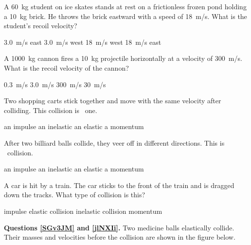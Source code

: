 \documentclass[]{exam}
\begin{document}
\begin{questions}
\question
A \SI{60}{kg} student on ice skates stands at rest on a frictionless frozen pond holding a \SI{10}{kg} brick. He throws the brick eastward with a speed of \SI{18}{m/s}. What is the student's recoil velocity?

\begin{randomizechoices}
\choice \SI{3.0}{m/s} east
\correctchoice \SI{3.0}{m/s} west
\choice \SI{18}{m/s} west
\choice \SI{18}{m/s} east
\end{randomizechoices}

\question
A \SI{1000}{kg} cannon fires a \SI{10}{kg} projectile horizontally at a velocity of \SI{300}{m/s}. What is the recoil velocity of the cannon?

\begin{randomizechoices}
\choice \SI{0.3}{m/s}
\correctchoice \SI{3.0}{m/s}
\choice \SI{300}{m/s}
\choice \SI{30}{m/s}
\end{randomizechoices}

\question
Two shopping carts stick together and move with the same velocity after colliding. This collision is \fillin\ one.

\begin{randomizechoices}
\choice an impulse
\correctchoice an inelastic
\choice an elastic
\choice a momentum
\end{randomizechoices}

\question
After two billiard balls collide, they veer off in different directions. This is \fillin\ collision.

\begin{randomizechoices}
\choice an impulse
\choice an inelastic
\correctchoice an elastic
\choice a momentum
\end{randomizechoices}

\question
A car is hit by a train. The car sticks to the front of the train and is dragged down the tracks. What type of collision is this?

\begin{randomizechoices}
\choice impulse
\choice elastic collision
\correctchoice inelastic collision
\choice momentum
\end{randomizechoices}

\clearpage


\begin{EnvUplevel}
\textbf{Questions \ref{SGv3JM} and \ref{jlNXIi}.} Two medicine balls elastically collide. Their masses and velocities before the collision are shown in the figure below.
\end{EnvUplevel}


\end{questions}
\end{document}
